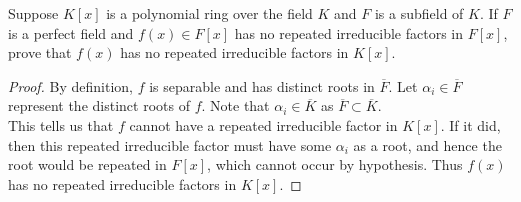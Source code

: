 \documentclass[num=9,duedate=04-07-21,course=Algebra\ II,proflastname=Walton]{hwtemplate}
\begin{document}
\problem[2]
\begin{claim}
	Suppose \(K[x]\) is a polynomial ring over the field \(K\) and \(F\) is a subfield of \(K\). If \(F\) is a perfect field and \(f(x) \in F[x]\) has no repeated irreducible factors in \(F[x]\), prove that \(f(x)\) has no repeated irreducible factors in \(K[x]\).
\end{claim}
\begin{proof}
	By definition, \(f\) is separable and has distinct roots in \(\overline{F}\). Let \(\alpha_i \in \overline{F}\) represent the distinct roots of \(f\). Note that \(\alpha_i \in \overline{K}\) as \(\overline{F}\subset \overline{K}\).\\

	This tells us that \(f\) cannot have a repeated irreducible factor in \(K[x]\). If it did, then this repeated irreducible factor must have some \(\alpha_i\) as a root, and hence the root would be repeated in \(F[x]\), which cannot occur by hypothesis. Thus \(f(x)\) has no repeated irreducible factors in \(K[x]\).
\end{proof}
\end{document}
